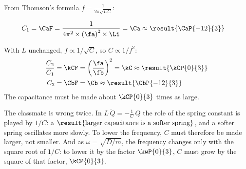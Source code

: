From Thomson's formula $f = \frac{1}{2\pi\sqrt{L\,C}}$:
\begin{abcliste}
\abc
\begin{align}
 C_1 &= \CaF = \frac{1}{4\pi^2\times\left(\fa\right)^2\times\Li} = \Ca \approx \result{\CaP{-12}{3}}
\end{align}

\abc With $L$ unchanged, $f \propto 1/\sqrt{C}$, so $C \propto 1/f^2$:
\begin{align}
 \frac{C_2}{C_1} &= \kCF = \left(\frac{\fa}{\fb}\right)^2 = \kC \approx \result{\kCP{0}{3}} \\
 C_2 &= \CbF = \Cb \approx \result{\CbP{-12}{3}}
\end{align}
The capacitance must be made about $\kCP{0}{3}$ times as large.

\abc The classmate is wrong twice. In $L\,\ddot Q = -\frac{1}{C}\,Q$ the role of the spring constant is played by $1/C$: a $\result{\text{larger capacitance is a softer spring}}$, and a softer spring oscillates more slowly. To lower the frequency, $C$ must therefore be made larger, not smaller. And as $\omega = \sqrt{D/m}$, the frequency changes only with the square root of $1/C$: to lower it by the factor $\kwP{0}{3}$, $C$ must grow by the square of that factor, $\kCP{0}{3}$.
\end{abcliste}
